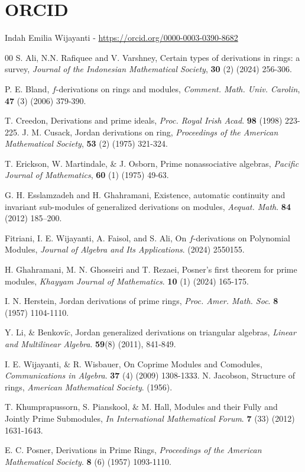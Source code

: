 \documentclass{arxiv}
\begin{document}
\section*{ORCID}

\noindent Indah Emilia Wijayanti - \url{https://orcid.org/0000-0003-0390-8682}



\begin{thebibliography}{00}
S. Ali, N.N. Rafiquee and V. Varshney, Certain types of derivations in rings: a survey, {\it Journal of the Indonesian Mathematical Society}, {\bf 30} (2) (2024) 256-306.

P. E. Bland, $f$-derivations on rings and modules, {\it Comment. Math. Univ. Carolin}, {\bf 47} (3) (2006) 379-390.

T. Creedon, Derivations and prime ideals, {\it Proc. Royal Irish Acad}. {\bf 98} (1998) 223-225.
J. M. Cusack, Jordan derivations on ring, {\it Proceedings of the American Mathematical Society}, {\bf 53} (2) (1975) 321-324.

T. Erickson, W. Martindale, \& J. Osborn, Prime nonassociative algebras, {\it Pacific Journal of Mathematics}, {\bf 60} (1) (1975) 49-63.

G. H. Esslamzadeh and H. Ghahramani, Existence, automatic continuity and invariant sub-modules of generalized derivations on modules, {\it Aequat. Math}. {\bf 84} (2012) 185–200.



Fitriani, I. E. Wijayanti, A. Faisol, and S. Ali, On $f$-derivations on Polynomial Modules, {\it Journal of Algebra and Its Applications}. (2024) 2550155.

H. Ghahramani, M. N. Ghosseiri and T. Rezaei, Posner's first theorem for prime modules, {\it Khayyam Journal of Mathematics}. {\bf 10} (1) (2024) 165-175.


I. N. Herstein, Jordan derivations of prime rings, {\it Proc. Amer. Math. Soc}. {\bf 8} (1957) 1104-1110.

Y. Li, \& Benkovi$\check{c}$, Jordan generalized derivations on triangular algebras, {\it Linear and Multilinear Algebra}. {\bf 59}(8) (2011), 841-849.

I. E. Wijayanti, \& R. Wisbauer, On Coprime Modules and Comodules, {\it Communications in Algebra}. {\bf 37} (4) (2009) 1308-1333.
N. Jacobson, Structure of rings, {\it American Mathematical Society}. (1956).

T. Khumprapussorn, S. Pianskool, \& M. Hall, Modules and their Fully and Jointly Prime Submodules, {\it In International Mathematical Forum}. {\bf 7} (33) (2012) 1631-1643.



E. C. Posner, Derivations in Prime Rings, {\it Proceedings of the American Mathematical Society}. {\bf 8} (6) (1957) 1093-1110.


\end{thebibliography}
\end{document}
